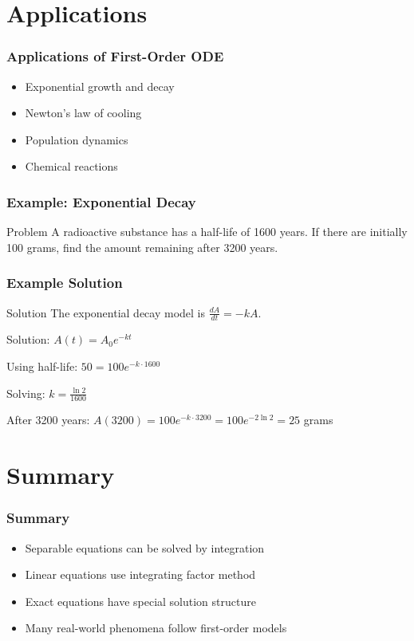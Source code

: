\section{Applications}

\begin{frame}
    \frametitle{Applications of First-Order ODE}
    
    \begin{itemize}
        \item Exponential growth and decay
        \item Newton's law of cooling
        \item Population dynamics
        \item Chemical reactions
    \end{itemize}
\end{frame}

\begin{frame}
    \frametitle{Example: Exponential Decay}
    
    \begin{problembox}{Problem}
        A radioactive substance has a half-life of 1600 years. If there are initially 100 grams, find the amount remaining after 3200 years.
    \end{problembox}
\end{frame}

\begin{frame}
    \frametitle{Example Solution}
    
    \begin{examplebox}{Solution}
        The exponential decay model is $\frac{dA}{dt} = -kA$.
        
        Solution: $A(t) = A_0 e^{-kt}$
        
        Using half-life: $50 = 100e^{-k \cdot 1600}$
        
        Solving: $k = \frac{\ln 2}{1600}$
        
        After 3200 years: $A(3200) = 100 e^{-k \cdot 3200} = 100 e^{-2\ln 2} = 25$ grams
    \end{examplebox}
\end{frame}

\section{Summary}

\begin{frame}
    \frametitle{Summary}
    
    \begin{itemize}
        \item Separable equations can be solved by integration
        \item Linear equations use integrating factor method
        \item Exact equations have special solution structure
        \item Many real-world phenomena follow first-order models
    \end{itemize}
\end{frame}


